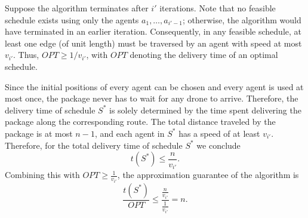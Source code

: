  




Suppose the algorithm terminates after $i'$ iterations.
Note that no feasible schedule exists using only the agents \( a_1, \dots, a_{i'-1} \); otherwise, the algorithm would have terminated in an earlier iteration. Consequently, in any feasible schedule, at least one edge (of unit length) must be traversed by an agent with speed at most \( v_{i'} \). Thus, \( OPT \geq 1 / v_{i'} \), with $OPT$ denoting the delivery time of an optimal schedule. 

Since the initial positions of every agent can be chosen and every agent is used at most once, the package never has to wait for any drone to arrive. Therefore, the delivery time of schedule $S^*$ is solely determined by the time spent delivering the package along the corresponding route. The total distance traveled by the package is at most \( n-1 \), and each agent in \( S^* \) has a speed of at least \( v_{i'} \). Therefore, for the total delivery time of schedule $S^*$ we conclude
\[
t(S^*) \leq \frac{n}{v_{i'}}.
\]
Combining this with \( OPT \geq \frac{1}{v_{i'}} \), the approximation guarantee of the algorithm is
\[
\frac{t(S^*)}{OPT} \leq \frac{\frac{n}{v_{i'}}}{\frac{1}{v_{i'}}} = n.
\]


